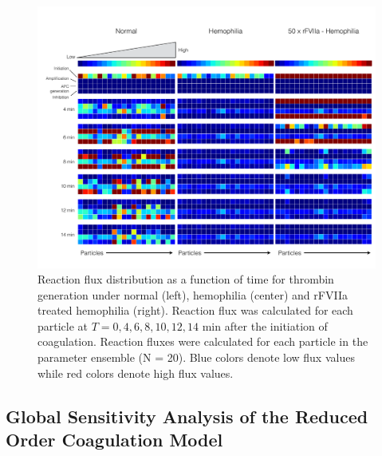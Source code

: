 \documentclass[processes,article,received,moreauthors,pdftex,12pt,a4paper]{mdpi}
\begin{document}
\begin{figure}[H]
\centering
\includegraphics[width=1.0\textwidth]{./figs/Figure-8-Flux-rFVIIa-Trigger.pdf}
\caption{Reaction flux distribution as a function of time for thrombin generation under normal (left), hemophilia (center) and rFVIIa treated hemophilia (right).
Reaction flux was calculated for each particle at $T = 0,4,6,8,10,12,14$ min after the initiation of coagulation. 
Reaction fluxes were calculated for each particle in the parameter ensemble (N = 20).
Blue colors denote low flux values while red colors denote high flux values.}\label{fig-flux-analysis}
\end{figure}

\subsection{Global Sensitivity Analysis of the Reduced Order Coagulation Model}
\end{document}
